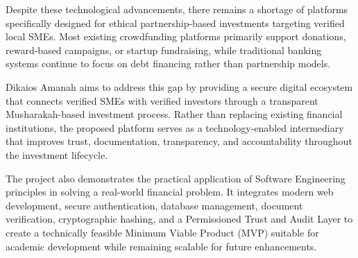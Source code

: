 Despite these technological advancements, there remains a shortage of platforms specifically designed for ethical partnership-based investments targeting verified local SMEs. Most existing crowdfunding platforms primarily support donations, reward-based campaigns, or startup fundraising, while traditional banking systems continue to focus on debt financing rather than partnership models.

Dikaios Amanah aims to address this gap by providing a secure digital ecosystem that connects verified SMEs with verified investors through a transparent Musharakah-based investment process. Rather than replacing existing financial institutions, the proposed platform serves as a technology-enabled intermediary that improves trust, documentation, transparency, and accountability throughout the investment lifecycle.

The project also demonstrates the practical application of Software Engineering principles in solving a real-world financial problem. It integrates modern web development, secure authentication, database management, document verification, cryptographic hashing, and a Permissioned Trust and Audit Layer to create a technically feasible Minimum Viable Product (MVP) suitable for academic development while remaining scalable for future enhancements.